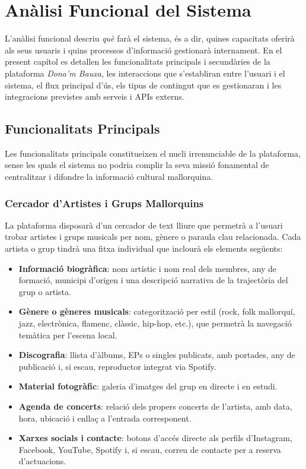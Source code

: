 \chapter{Anàlisi Funcional del Sistema}
\label{chapter:funcional}

L'anàlisi funcional descriu \textit{què} farà el sistema, és a dir, quines capacitats oferirà als seus usuaris i quins processos d'informació gestionarà internament. En el present capítol es detallen les funcionalitats principals i secundàries de la plataforma \textit{Dona'm Bauxa}, les interaccions que s'establiran entre l'usuari i el sistema, el flux principal d'ús, els tipus de contingut que es gestionaran i les integracions previstes amb serveis i APIs externs.

\section{Funcionalitats Principals}

Les funcionalitats principals constitueixen el nucli irrenunciable de la plataforma, sense les quals el sistema no podria complir la seva missió fonamental de centralitzar i difondre la informació cultural mallorquina.

\subsection{Cercador d'Artistes i Grups Mallorquins}

La plataforma disposarà d'un cercador de text lliure que permetrà a l'usuari trobar artistes i grups musicals per nom, gènere o paraula clau relacionada. Cada artista o grup tindrà una fitxa individual que inclourà els elements següents:

\begin{itemize}
    \item \textbf{Informació biogràfica}: nom artístic i nom real dels membres, any de formació, municipi d'origen i una descripció narrativa de la trajectòria del grup o artista.
    \item \textbf{Gènere o gèneres musicals}: categorització per estil (rock, folk mallorquí, jazz, electrònica, flamenc, clàssic, hip-hop, etc.), que permetrà la navegació temàtica per l'escena local.
    \item \textbf{Discografia}: llista d'àlbums, EPs o singles publicats, amb portades, any de publicació i, si escau, reproductor integrat via Spotify.
    \item \textbf{Material fotogràfic}: galeria d'imatges del grup en directe i en estudi.
    \item \textbf{Agenda de concerts}: relació dels propers concerts de l'artista, amb data, hora, ubicació i enllaç a l'entrada corresponent.
    \item \textbf{Xarxes socials i contacte}: botons d'accés directe als perfils d'Instagram, Facebook, YouTube, Spotify i, si escau, correu de contacte per a reserva d'actuacions.
\end{itemize}

